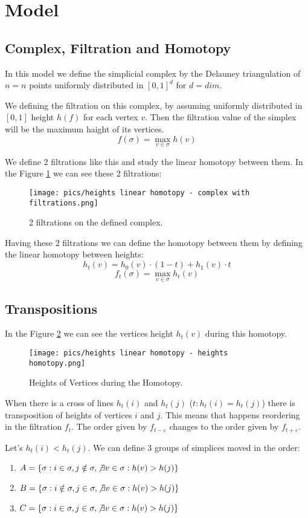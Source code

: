 \section{Model}
\subsection{Complex, Filtration and Homotopy}
\par In this model we define the simplicial complex by the Delauney triangulation of $n = {n}$ points uniformly distributed in $[0, 1]^d$ for $d = {dim}$.
\par We defining the filtration on this complex, by assuming uniformly distributed in $[0, 1]$ height $h(f)$ for each vertex $v$. Then the filtration value of the simplex will be the maximum haight of its vertices.
$$
    f(\sigma) = \max_{v\in \sigma} h(v)
$$
\par We define 2 filtrations like this and study the linear homotopy between them. In the Figure \ref{fig:complex} we can see these 2 filtrations:
\begin{figure}[h!]
    \centering
    \texttt{[image: pics/heights linear homotopy - complex with filtrations.png]}
    \caption{2 filtrations on the defined complex.}
    \label{fig:complex}
\end{figure}

\par Having these 2 filtrations we can define the homotopy between them by defining the linear homotopy between heights:
$$
    h_t(v) = h_0(v)\cdot(1 - t) + h_1(v)\cdot t
$$
$$
    f_t(\sigma) = \max_{v\in \sigma} h_t(v)
$$

\subsection{Transpositions}
\par In the Figure \ref{fig:homotopy} we can see the vertices height $h_t(v)$ during this homotopy. 
\begin{figure}[h!]
    \centering
    \texttt{[image: pics/heights linear homotopy - heights homotopy.png]}
    \caption{Heights of Vertices during the Homotopy.}
    \label{fig:homotopy}
\end{figure}
\par When there is a cross of lines $h_t(i)$ and $h_t(j)$ ($t: h_t(i) = h_t(j)$) there is transposition of heights of vertices $i$ and $j$. This means that happens reordering in the filtration $f_t$. The order given by $f_{t - \varepsilon}$ changes to the order given by $f_{t + \varepsilon}$.
\par Let's $h_t(i) < h_t(j)$. We can define 3 groups of simplices moved in the order:
\begin{enumerate}
    \item $A = \{\sigma: i \in \sigma, j\notin \sigma, \not\exists v\in \sigma: h(v) > h(j)\}$
    \item $B = \{\sigma: i \notin \sigma, j\in \sigma, \not\exists v\in \sigma: h(v) > h(j)\}$
    \item $C = \{\sigma: i \in \sigma, j\in \sigma, \not\exists v\in \sigma: h(v) > h(j)\}$
\end{enumerate}

